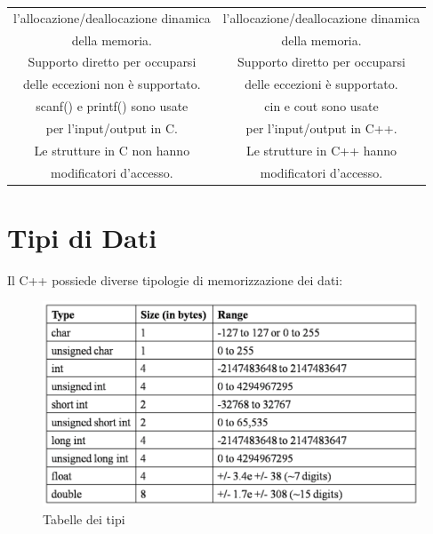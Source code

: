 \begin{longtable}{|c|c|}
	\textsf{\small l'allocazione/deallocazione dinamica} & \textsf{\small l'allocazione/deallocazione dinamica} \\
	\textsf{\small  della memoria.} & \textsf{\small della memoria.} \\
	\hline
	\textsf{\small Supporto diretto per occuparsi} & \textsf{\small Supporto diretto per occuparsi} \\
	\textsf{\small delle eccezioni non è supportato.} & \textsf{\small delle eccezioni è supportato.} \\
	\hline
	\textsf{\small scanf() e printf() sono usate} & \textsf{\small cin e cout sono usate} \\
	\textsf{\small per l'input/output in C.} & \textsf{\small per l'input/output in C++.} \\
	\hline
	\textsf{\small Le strutture in C non hanno} & \textsf{\small Le strutture in C++ hanno} \\
	\textsf{\small modificatori d'accesso.} & \textsf{\small modificatori d'accesso.} \\
	\hline
\end{longtable}


\newpage

\section{Tipi di Dati}


\textsf{\small Il C++ possiede diverse tipologie di memorizzazione dei dati: }\\

\begin{figure}[ht]
	\centering
	\includegraphics[width=1\textwidth, height=1\textheight, keepaspectratio]{./imgs/data_types_table.png}
	\caption{Tabelle dei tipi}
	\label{fig:data_types}
\end{figure}

